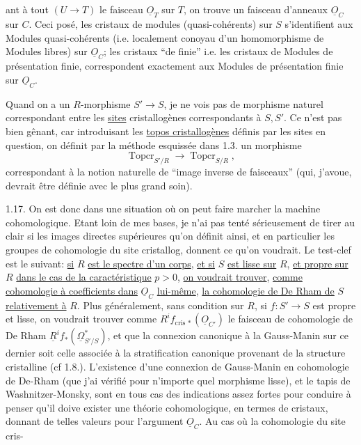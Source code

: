 ant  à tout $(U\to T)$ le faisceau $\underline{O}_T$ sur $T$, on trouve un faisceau d'anneaux $\underline{O}_C$ sur $C$. Ceci posé, les cristaux de modules (quasi-cohérents) sur $S$ s'identifient aux Modules quasi-cohérents (i.e. localement conoyau d'un homomorphisme de Modules libres) sur $\underline{O}_C$; les cristaux ``de   finie'' i.e. les cristaux de Modules de présentation finie, correspondent exactement aux Modules de présentation finie sur $\underline{O}_C$.

Quand on a un $R$-morphisme $S'\longrightarrow S$, je ne vois pas de morphisme naturel correspondant entre les \uline{sites} cristallogènes correspondants à $S,S'$. Ce n'est pas bien gênant, car introduisant les \uline{topos cristallogènes}  définis par les sites en question, on définit par la méthode esquissée dans 1.3. un morphisme
\[
\operatorname{Topcr}_{S'/R}\longrightarrow\operatorname{Topcr}_{S/R},
\]
correspondant à la notion naturelle de ``image inverse de faisceaux''  (qui, j'avoue, devrait être définie avec le plus grand soin).

1.17. On est donc dans une situation où on peut faire marcher la machine cohomologique. Etant loin de mes bases, je n'ai pas tenté sérieusement de tirer au clair si les images directes supérieures qu'on définit ainsi, et en particulier les groupes de cohomologie du site cristallog, donnent ce qu'on voudrait. Le test-clef est le suivant: \uline{si} $R$ \uline{est le spectre d'un corps}, \uline{et si} $S$ \uline{est lisse sur} $R$, \uline{et propre sur} $R$ \uline{dans le cas de la caractéristique} $p>0$, \uline{on voudrait trouver}, \uline{comme cohomologie à coefficients dans} $\underline{O}_C$ \uline{lui-même}, \uline{la cohomologie de De Rham de} $S$ \uline{relativement à} $R$.
Plus généralement, sans condition sur $R$, si $f:S'\to S$ est propre et lisse, on voudrait trouver comme  $R^if_{\mathrm{cris}\,*}(\underline{O}_{C'})$  le faisceau de cohomologie de De Rham $\underline{R}^if_*(\underline{\Omega}^{*}_{S'/S})$,  et  que la connexion canonique à la Gauss-Manin sur ce dernier soit celle associée à la stratification canonique provenant de la structure cristalline (cf 1.8.). L'existence d'une connexion de Gauss-Manin en cohomologie de De-Rham (que j'ai vérifié pour n'importe quel morphisme lisse), et le tapis de Washnitzer-Monsky, sont en tous cas des indications assez fortes pour conduire à penser qu'il doive exister une théorie cohomologique, en termes de cristaux, donnant de telles valeurs pour l'argument $\underline{O}_C$. Au cas où la cohomologie du site cris-
